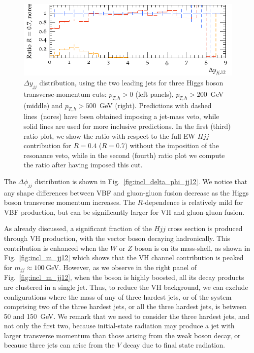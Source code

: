 \documentclass[10pt,prd,fleqn,superscriptaddress,notitlepage,nofootinbib,preprintnumbers,nobalancelastpage]{revtex4-1}
\newcommand{\VBF}{VBF\xspace}
\newcommand{\VH}{VH\xspace}
\begin{document}
\begin{figure}[p]
\begin{minipage}{0.28\textwidth}
    \includegraphics[width=\textwidth]{figures/vbfvh/nores-pt500-ratio4.pdf}
    \end{minipage}
    \caption{$\Delta y_{jj}$ distribution, using the two leading jets for three Higgs boson transverse-momentum cuts: $p_{T,h}>0$ (left panels), $p_{T,h}>200$~GeV (middle) and $p_{T,h}>500$~GeV (right).
    Predictions with dashed lines~(nores) have been obtained imposing a jet-mass veto, while solid lines are used for more inclusive predictions.
    In the first (third) ratio plot, we show the ratio with respect to the full EW $Hjj$ contribution for $R=0.4$ ($R=0.7$) without the imposition of the resonance veto, while in the second (fourth) ratio plot we compute the ratio after having imposed this cut.}
    \label{fig:deltay_massveto}
\end{figure}

The $\Delta\phi_{jj}$ distribution is shown in Fig.~\ref{fig:incl_delta_phi_jj12}. We notice that any shape differences between \VBF and gluon-gluon fusion decrease as the Higgs boson transverse momentum increases. The $R$-dependence is relatively mild for \VBF production, but can be significantly larger for \VH and gluon-gluon fusion.

As already discussed, a significant fraction of the $Hjj$ cross section is produced through \VH production, with the vector boson decaying hadronically. This contribution is enhanced when the $W$ or $Z$ boson is on its mass-shell, as shown in Fig.~\ref{fig:incl_m_jj12} which shows that the \VH channel contribution is peaked for $m_{jj}\approx100~$GeV.
However, as we observe in the right panel of Fig.~\ref{fig:incl_m_jj12}, when the boson is highly boosted, all its decay products are clustered in a single jet.
Thus, to reduce the \VH background, we can exclude configurations where the mass of any of three hardest jets, or of the system comprising two of the three hardest jets, or all the three hardest jets, is between 50 and 150~GeV. We remark that we need to consider the three hardest jets, and not only the first two, because initial-state radiation may produce a jet with larger transverse momentum than those arising from the weak boson decay, or because three jets can arise from the $V$ decay due to final state radiation.
\end{document}
